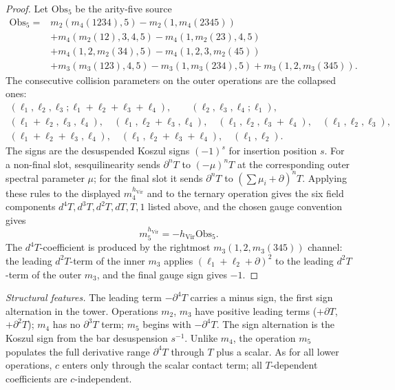 \begin{proof}
Let \(\mathrm{Obs}_5\) be the arity-five source
\[
\begin{aligned}
\mathrm{Obs}_5={}&
m_2(m_4(1234),5)-m_2(1,m_4(2345))
\\
&+m_4(m_2(12),3,4,5)-m_4(1,m_2(23),4,5)
\\
&+m_4(1,2,m_2(34),5)-m_4(1,2,3,m_2(45))
\\
&+m_3(m_3(123),4,5)-m_3(1,m_3(234),5)
+m_3(1,2,m_3(345)).
\end{aligned}
\]
The consecutive collision parameters on the outer operations are the
collapsed ones:
\[
\begin{gathered}
(\ell_1,\ell_2,\ell_3;\ell_1+\ell_2+\ell_3+\ell_4),
\qquad
(\ell_2,\ell_3,\ell_4;\ell_1),                                      \\
(\ell_1+\ell_2,\ell_3,\ell_4),\quad
(\ell_1,\ell_2+\ell_3,\ell_4),\quad
(\ell_1,\ell_2,\ell_3+\ell_4),\quad
(\ell_1,\ell_2,\ell_3),                                             \\
(\ell_1+\ell_2+\ell_3,\ell_4),\quad
(\ell_1,\ell_2+\ell_3+\ell_4),\quad
(\ell_1,\ell_2).
\end{gathered}
\]
The signs are the desuspended Koszul signs \((-1)^s\) for insertion
position \(s\).  For a non-final slot, sesquilinearity sends
\(\partial^nT\) to \((-\mu)^nT\) at the corresponding outer spectral
parameter \(\mu\); for the final slot it sends \(\partial^nT\) to
\((\sum\mu_i+\partial)^nT\).  Applying these rules to the displayed
\(m_4^{h_{\mathrm{Vir}}}\) and to the ternary operation gives the
six field components \(d^4T,d^3T,d^2T,dT,T,1\) listed above, and the
chosen gauge convention gives
\[
m_5^{h_{\mathrm{Vir}}}=-h_{\mathrm{Vir}}\mathrm{Obs}_5 .
\]
The \(d^4T\)-coefficient is produced by the rightmost
\(m_3(1,2,m_3(345))\) channel: the leading \(d^2T\)-term of the inner
\(m_3\) applies \((\ell_1+\ell_2+\partial)^2\) to the leading
\(d^2T\)-term of the outer \(m_3\), and the final gauge sign gives
\(-1\).
\end{proof}

\noindent
\textit{Structural features.}
The leading term $-\partial^4 T$ carries a minus sign, the first
sign alternation in the tower.
Operations $m_2$, $m_3$ have positive leading terms ($+\partial T$,
$+\partial^2 T$); $m_4$ has no $\partial^3 T$ term; $m_5$ begins
with $-\partial^4 T$.
The sign alternation is the Koszul sign from the bar desuspension
$s^{-1}$.
Unlike $m_4$, the operation $m_5$ populates the full derivative range
$\partial^4 T$ through $T$ plus a scalar.
As for all lower operations, $c$ enters only through the scalar
contact term; all $T$-dependent coefficients are $c$-independent.

